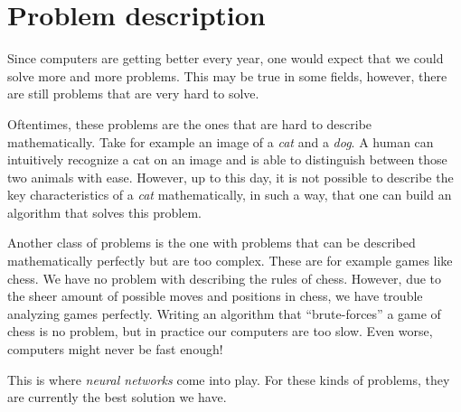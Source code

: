 \section{Problem description}
\label{sec:problem-description}

Since computers are getting better every year, one would expect that we could solve more and more problems.
This may be true in some fields, however, there are still problems that are very hard to solve.

Oftentimes, these problems are the ones that are hard to describe mathematically.
Take for example an image of a \emph{cat} and a \emph{dog}.
A human can intuitively recognize a cat on an image and is able to distinguish between those two animals with ease.
However, up to this day, it is not possible to describe the key characteristics of a \emph{cat} mathematically, 
in such a way, that one can build an algorithm that solves this problem.

Another class of problems is the one with problems that can be described mathematically perfectly but are too complex.
These are for example games like chess.
We have no problem with describing the rules of chess.
However, due to the sheer amount of possible moves and positions in chess, we have trouble analyzing games perfectly.
Writing an algorithm that \enquote{brute-forces} a game of chess is no problem, but in practice our computers are too slow.
Even worse, computers might never be fast enough!

This is where \emph{neural networks} come into play.
For these kinds of problems, they are currently the best solution we have.